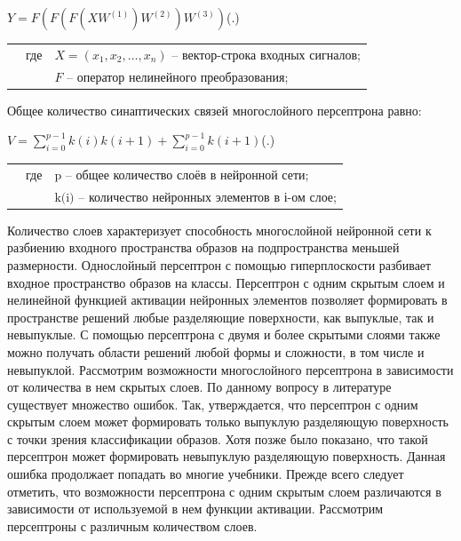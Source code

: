 {		\formulaspace \par \redline 
	$Y = F(F(F(XW^{(1)})W^{(2)})W^{(3)})$\hfill (\thechaptercntr .\theformulacntr) \redline
	\formulaspace \addtocounter{formulacntr}{1}
	
	\begin{tabular}{p{}p{}p{}}
		& где  & $X=(x_1,x_2,\dots,x_n)$ {--} вектор-строка входных сигналов; \\
		&      & $F$ {--} оператор нелинейного преобразования; \\
	\end{tabular}
	
	\par \redline Общее количество синаптических связей многослойного персептрона равно:
	
	\formulaspace \par \redline 
	$V = \sum \limits _{i=0}^{p-1} k(i)k(i+1) + \sum \limits _{i=0}^{p-1} k(i+1)$\hfill (\thechaptercntr .\theformulacntr) \redline
	\formulaspace \addtocounter{formulacntr}{1}
	
	\begin{tabular}{p{}p{}p{}}
		& где  & $\textrm{p}$ {--} общее количество слоёв в нейронной сети; \\
		&      & $\textrm{k(i)}$ {--} количество нейронных элементов в і-ом слое; \\
		\end{tabular}
	
	\par \redline  Количество слоев характеризует способность многослойной нейронной сети к разбиению входного пространства образов на подпространства меньшей размерности. Однослойный персептрон с помощью гиперплоскости разбивает входное пространство образов на классы. Персептрон с одним скрытым слоем и
	нелинейной функцией активации нейронных элементов позволяет формировать в пространстве решений любые разделяющие поверхности, как выпуклые, так и невыпуклые. С помощью персептрона с двумя и более скрытыми слоями также можно получать области решений любой формы и сложности, в том числе и невыпуклой. Рассмотрим возможности многослойного персептрона в зависимости от количества в нем скрытых слоев. По данному вопросу в литературе существует множество ошибок. Так, утверждается, что персептрон с одним скрытым слоем может формировать только выпуклую разделяющую поверхность с точки зрения классификации образов. Хотя позже было показано, что такой персептрон может формировать невыпуклую разделяющую поверхность. Данная ошибка продолжает попадать во многие учебники. Прежде всего следует отметить, что возможности персептрона с одним скрытым слоем различаются в зависимости от используемой в нем функции активации. Рассмотрим персептроны с различным количеством слоев.
	
}
